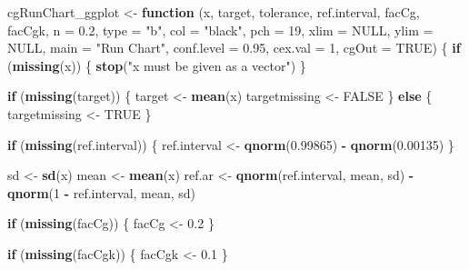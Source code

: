 \documentclass[
]{book}
\newenvironment{Shaded}{\begin{snugshade}}{\end{snugshade}}
\newcommand{\AttributeTok}[1]{\textcolor[rgb]{0.13,0.29,0.53}{#1}}
\newcommand{\ConstantTok}[1]{\textcolor[rgb]{0.56,0.35,0.01}{#1}}
\newcommand{\ControlFlowTok}[1]{\textcolor[rgb]{0.13,0.29,0.53}{\textbf{#1}}}
\newcommand{\DecValTok}[1]{\textcolor[rgb]{0.00,0.00,0.81}{#1}}
\newcommand{\FloatTok}[1]{\textcolor[rgb]{0.00,0.00,0.81}{#1}}
\newcommand{\FunctionTok}[1]{\textcolor[rgb]{0.13,0.29,0.53}{\textbf{#1}}}
\newcommand{\NormalTok}[1]{#1}
\newcommand{\OtherTok}[1]{\textcolor[rgb]{0.56,0.35,0.01}{#1}}
\newcommand{\SpecialCharTok}[1]{\textcolor[rgb]{0.81,0.36,0.00}{\textbf{#1}}}
\newcommand{\StringTok}[1]{\textcolor[rgb]{0.31,0.60,0.02}{#1}}
\begin{document}
\begin{Shaded}
\begin{Highlighting}[]
\NormalTok{cgRunChart\_ggplot }\OtherTok{\textless{}{-}} \ControlFlowTok{function}\NormalTok{ (x, target, tolerance, ref.interval, facCg, facCgk,}
                       \AttributeTok{n =} \FloatTok{0.2}\NormalTok{, }\AttributeTok{type =} \StringTok{"b"}\NormalTok{, }\AttributeTok{col =} \StringTok{"black"}\NormalTok{, }\AttributeTok{pch =} \DecValTok{19}\NormalTok{,}
                       \AttributeTok{xlim =} \ConstantTok{NULL}\NormalTok{, }\AttributeTok{ylim =} \ConstantTok{NULL}\NormalTok{, }\AttributeTok{main =} \StringTok{"Run Chart"}\NormalTok{,}
                       \AttributeTok{conf.level =} \FloatTok{0.95}\NormalTok{, }\AttributeTok{cex.val =} \DecValTok{1}\NormalTok{, }\AttributeTok{cgOut =} \ConstantTok{TRUE}\NormalTok{) }
\NormalTok{\{}
  \ControlFlowTok{if}\NormalTok{ (}\FunctionTok{missing}\NormalTok{(x)) \{}
    \FunctionTok{stop}\NormalTok{(}\StringTok{"x must be given as a vector"}\NormalTok{)}
\NormalTok{  \}}
  
  \ControlFlowTok{if}\NormalTok{ (}\FunctionTok{missing}\NormalTok{(target)) \{}
\NormalTok{    target }\OtherTok{\textless{}{-}} \FunctionTok{mean}\NormalTok{(x)}
\NormalTok{    targetmissing }\OtherTok{\textless{}{-}} \ConstantTok{FALSE}
\NormalTok{  \} }\ControlFlowTok{else}\NormalTok{ \{}
\NormalTok{    targetmissing }\OtherTok{\textless{}{-}} \ConstantTok{TRUE}
\NormalTok{  \}}
  
  \ControlFlowTok{if}\NormalTok{ (}\FunctionTok{missing}\NormalTok{(ref.interval)) \{}
\NormalTok{    ref.interval }\OtherTok{\textless{}{-}} \FunctionTok{qnorm}\NormalTok{(}\FloatTok{0.99865}\NormalTok{) }\SpecialCharTok{{-}} \FunctionTok{qnorm}\NormalTok{(}\FloatTok{0.00135}\NormalTok{)}
\NormalTok{  \}}
  
\NormalTok{  sd }\OtherTok{\textless{}{-}} \FunctionTok{sd}\NormalTok{(x)}
\NormalTok{  mean }\OtherTok{\textless{}{-}} \FunctionTok{mean}\NormalTok{(x)}
\NormalTok{  ref.ar }\OtherTok{\textless{}{-}} \FunctionTok{qnorm}\NormalTok{(ref.interval, mean, sd) }\SpecialCharTok{{-}} \FunctionTok{qnorm}\NormalTok{(}\DecValTok{1} \SpecialCharTok{{-}}\NormalTok{ ref.interval, mean, sd)}
  
  \ControlFlowTok{if}\NormalTok{ (}\FunctionTok{missing}\NormalTok{(facCg)) \{}
\NormalTok{    facCg }\OtherTok{\textless{}{-}} \FloatTok{0.2}
\NormalTok{  \}}
  
  \ControlFlowTok{if}\NormalTok{ (}\FunctionTok{missing}\NormalTok{(facCgk)) \{}
\NormalTok{    facCgk }\OtherTok{\textless{}{-}} \FloatTok{0.1}
\NormalTok{  \}}
  

\end{Highlighting}
\end{Shaded}
\end{document}
